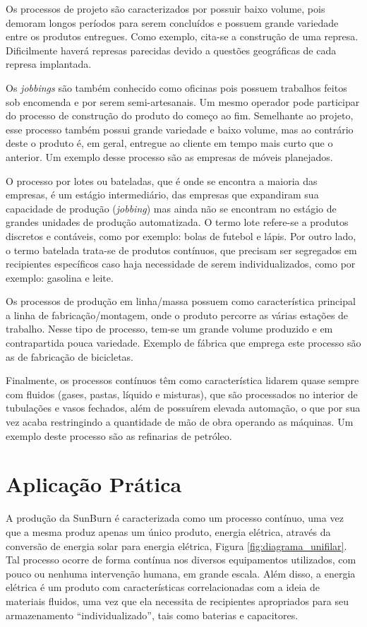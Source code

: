 Os processos de projeto são caracterizados por possuir baixo volume, pois demoram longos períodos para serem concluídos e possuem grande variedade entre os produtos entregues. Como exemplo, cita-se a construção de uma represa. Dificilmente haverá represas parecidas devido a questões geográficas de cada represa implantada.

Os \textit{jobbings} são também conhecido como oficinas pois possuem trabalhos feitos sob encomenda e por serem semi-artesanais. Um mesmo operador pode participar do processo de construção do produto do começo ao fim. Semelhante ao projeto, esse processo também possui grande variedade e baixo volume, mas ao contrário deste o produto é, em geral, entregue ao cliente em tempo mais curto que o anterior. Um exemplo desse processo são as empresas de móveis planejados.

O processo por lotes ou bateladas, que é onde se encontra a maioria das empresas, é um estágio intermediário, das empresas que expandiram sua capacidade de produção (\textit{jobbing}) mas ainda não se encontram no estágio de grandes unidades de produção automatizada. O termo lote refere-se a produtos discretos e contáveis, como por exemplo: bolas de futebol e lápis. Por outro lado, o termo batelada trata-se de produtos contínuos, que precisam ser segregados em recipientes específicos caso haja necessidade de serem individualizados, como por exemplo: gasolina e leite.

Os processos de produção em linha/massa possuem como característica principal a linha de fabricação/montagem, onde o produto percorre as várias estações de trabalho. Nesse tipo de processo, tem-se um grande volume produzido e em contrapartida pouca variedade. Exemplo de fábrica que emprega este processo são as de fabricação de bicicletas.

Finalmente, os processos contínuos têm como característica lidarem quase sempre com fluidos (gases, pastas, líquido e misturas), que são processados no interior de tubulações e vasos fechados, além de possuírem elevada automação, o que por sua vez acaba restringindo a quantidade de mão de obra operando as máquinas. Um exemplo deste processo são as refinarias de petróleo.


\section{Aplicação Prática}
\label{sec:tipos_de_processo_de_producao_aplicacao}

A produção da SunBurn é caracterizada como um processo contínuo, uma vez que a mesma produz apenas um único produto, energia elétrica, através da conversão de energia solar para energia elétrica, Figura \ref{fig:diagrama_unifilar}. Tal processo ocorre de forma contínua nos diversos equipamentos utilizados, com pouco ou nenhuma intervenção humana, em grande escala. Além disso, a energia elétrica é um produto com características correlacionadas com a ideia de materiais fluidos, uma vez que ela necessita de recipientes apropriados para seu armazenamento ``individualizado'', tais como baterias e capacitores.

